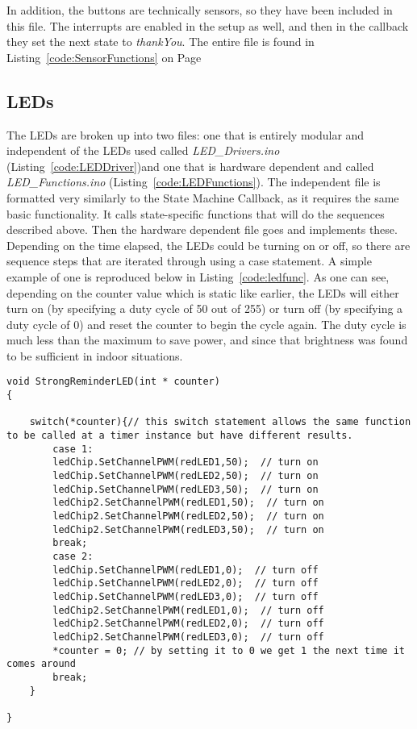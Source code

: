 \documentclass{article}
\begin{document}
In addition, the buttons are technically sensors, so they have been included in this file. The interrupts are enabled in the setup as well, and then in the callback they set the next state to \textsl{thankYou}. The entire file is found in Listing~\ref{code:SensorFunctions} on Page~\pageref{code:SensorFunctions}

\subsection{LEDs}
The LEDs are broken up into two files: one that is entirely modular and independent of the LEDs used called \textit{LED\_Drivers.ino} (Listing~\ref{code:LEDDriver})and one that is hardware dependent and called \textit{LED\_Functions.ino} (Listing~\ref{code:LEDFunctions}). The independent file is formatted very similarly to the State Machine Callback, as it requires the same basic functionality. It calls state-specific functions that will do the sequences described above. Then the hardware dependent file goes and implements these. Depending on the time elapsed, the LEDs could be turning on or off, so there are sequence steps that are iterated through using a case statement. A simple example of one is reproduced below in Listing~\ref{code:ledfunc}. As one can see, depending on the counter value which is static like earlier, the LEDs will either turn on (by specifying a duty cycle of 50 out of 255) or turn off (by specifying a duty cycle of 0) and reset the counter to begin the cycle again. The duty cycle is much less than the maximum to save power, and since that brightness was found to be sufficient in indoor situations. 

\begin{lstlisting}[caption={The Strong Reminder LED function}, label={code:ledfunc}]
void StrongReminderLED(int * counter)
{

	switch(*counter){// this switch statement allows the same function to be called at a timer instance but have different results. 
		case 1: 
		ledChip.SetChannelPWM(redLED1,50);  // turn on
		ledChip.SetChannelPWM(redLED2,50);  // turn on
		ledChip.SetChannelPWM(redLED3,50);  // turn on
		ledChip2.SetChannelPWM(redLED1,50);  // turn on
		ledChip2.SetChannelPWM(redLED2,50);  // turn on
		ledChip2.SetChannelPWM(redLED3,50);  // turn on
		break;
		case 2: 
		ledChip.SetChannelPWM(redLED1,0);  // turn off
		ledChip.SetChannelPWM(redLED2,0);  // turn off
		ledChip.SetChannelPWM(redLED3,0);  // turn off
		ledChip2.SetChannelPWM(redLED1,0);  // turn off
		ledChip2.SetChannelPWM(redLED2,0);  // turn off
		ledChip2.SetChannelPWM(redLED3,0);  // turn off
		*counter = 0; // by setting it to 0 we get 1 the next time it comes around 
		break;
	}

}

\end{lstlisting}
\end{document}
